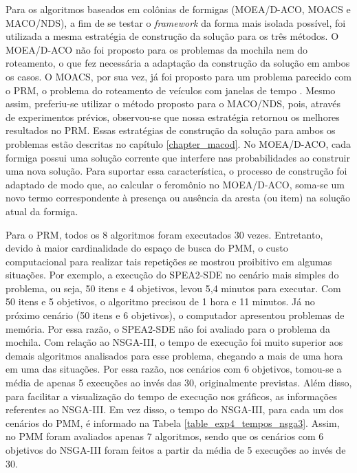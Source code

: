 Para os algoritmos baseados em colônias de formigas (MOEA/D-ACO, MOACS e MACO/NDS), a fim de se testar o \textit{framework} da forma mais isolada possível, foi utilizada a mesma estratégia de construção da solução para os três métodos. O MOEA/D-ACO não foi proposto para os problemas da mochila nem do roteamento, o que fez necessária a adaptação da construção da solução em ambos os casos. O MOACS, por sua vez, já foi proposto para um problema parecido com o PRM, o problema do roteamento de veículos com janelas de tempo \cite{Baran2003}. Mesmo assim, preferiu-se utilizar o método proposto para o MACO/NDS, pois, através de experimentos prévios, observou-se que nossa estratégia retornou os melhores resultados no PRM. Essas estratégias de construção da solução para ambos os problemas estão descritas no capítulo \ref{chapter_macod}. No MOEA/D-ACO, cada formiga possui uma solução corrente que interfere nas probabilidades ao construir uma nova solução. Para suportar essa característica, o processo de construção foi adaptado de modo que, ao calcular o feromônio no MOEA/D-ACO, soma-se um novo termo correspondente à presença ou ausência da aresta (ou item) na solução atual da formiga.

Para o PRM, todos os 8 algoritmos foram executados 30 vezes. Entretanto, devido à maior cardinalidade do espaço de busca do PMM, o custo computacional para realizar tais repetições se mostrou proibitivo em algumas situações. Por exemplo, a execução do SPEA2-SDE no cenário mais simples do problema, ou seja, 50 itens e 4 objetivos, levou 5,4 minutos para executar. Com 50 itens e 5 objetivos, o algoritmo precisou de 1 hora e 11 minutos. Já no próximo cenário (50 itens e 6 objetivos), o computador apresentou problemas de memória. Por essa razão, o SPEA2-SDE não foi avaliado para o problema da mochila. Com relação ao NSGA-III, o tempo de execução foi muito superior aos demais algoritmos analisados para esse problema, chegando a mais de uma hora em uma das situações. Por essa razão, nos cenários com 6 objetivos, tomou-se a média de apenas 5 execuções ao invés das 30, originalmente previstas. Além disso, para facilitar a visualização do tempo de execução nos gráficos, as informações referentes ao NSGA-III. Em vez disso, o tempo do NSGA-III, para cada um dos cenários do PMM, é informado na Tabela \ref{table_exp4_tempos_nsga3}. Assim, no PMM foram avaliados apenas 7 algoritmos, sendo que os cenários com 6 objetivos do NSGA-III foram feitos a partir da média de 5 execuções ao invés de 30.

